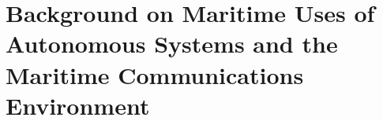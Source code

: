 

\chapter{Background on Maritime Uses of Autonomous Systems and the Maritime Communications Environment} 
\label{Chapter\thechapter}


